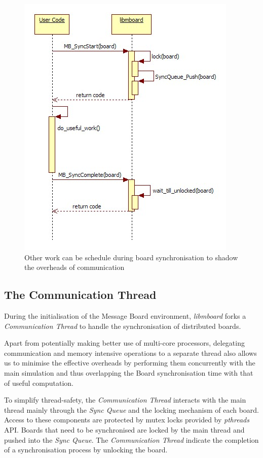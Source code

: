 \begin{figure}[h]
 \centering
  \includegraphics[scale=0.60]{syncboard.jpg}
 \caption{Other work can be schedule during board synchronisation to shadow the overheads of communication}
 \label{fig:syncboard}
\end{figure}

\subsection{The Communication Thread}
\label{sec:commthread}

During the initialisation of the Message Board environment, \textit{libmboard} forks a \textit{Communication Thread} to handle the synchronisation of distributed boards. 

Apart from potentially making better use of multi-core processors, delegating communication and memory intensive operations to a separate thread also allows us to minimise the effective overheads by performing them concurrently with the main simulation and thus overlapping the Board synchronisation time with that of useful computation.

To simplify thread-safety, the \textit{Communication Thread} interacts with the main thread mainly through the \textit{Sync Queue} and the locking mechanism of each board. Access to these components are protected by mutex locks provided by \textit{pthreads} API. Boards that need to be synchronised are locked by the main thread and pushed into the \textit{Sync Queue}. The \textit{Communication Thread} indicate the completion of a synchronisation process by unlocking the board.

